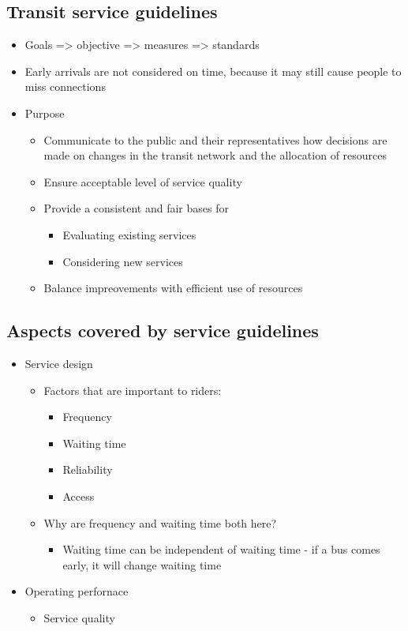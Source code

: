 \documentclass[11pt]{article}
\begin{document}
\subsection{Transit service guidelines}
\label{sec:orgddd607c}
\begin{itemize}
\item Goals => objective => measures => standards
\item Early arrivals are not considered on time, because it may still cause people to miss connections
\item Purpose
\begin{itemize}
\item Communicate to the public and their representatives how decisions are made on changes in the transit network and the allocation of resources
\item Ensure acceptable level of service quality
\item Provide a consistent and fair bases for
\begin{itemize}
\item Evaluating existing services
\item Considering new services
\end{itemize}
\item Balance impreovements with efficient use of resources
\end{itemize}
\end{itemize}

\subsection{Aspects covered by service guidelines}
\label{sec:org00bbd63}
\begin{itemize}
\item Service design
\begin{itemize}
\item Factors that are important to riders:
\begin{itemize}
\item Frequency
\item Waiting time
\item Reliability
\item Access
\end{itemize}
\item Why are frequency and waiting time both here?
\begin{itemize}
\item Waiting time can be independent of waiting time - if a bus comes early, it will change waiting time
\end{itemize}
\end{itemize}
\item Operating perfornace
\begin{itemize}
\item Service quality
\end{itemize}
\end{itemize}
\end{document}
